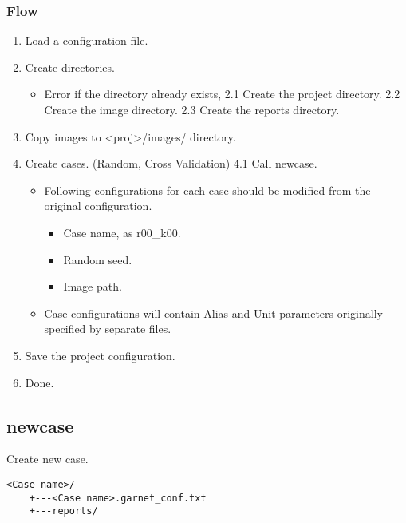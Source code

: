 \documentclass[]{article}
\begin{document}
\subsubsection{Flow}\label{flow}

\begin{enumerate}
\def\labelenumi{\arabic{enumi}.}
\itemsep1pt\parskip0pt
\item
  Load a configuration file.
\item
  Create directories.

  \begin{itemize}
  \itemsep1pt\parskip0pt
  \item
    Error if the directory already exists, 2.1 Create the project
    directory. 2.2 Create the image directory. 2.3 Create the reports
    directory.
  \end{itemize}
\item
  Copy images to \textless{}proj\textgreater{}/images/ directory.
\item
  Create cases. (Random, Cross Validation) 4.1 Call newcase.

  \begin{itemize}
  \itemsep1pt\parskip0pt
  \item
    Following configurations for each case should be modified from the
    original configuration.

    \begin{itemize}
    \itemsep1pt\parskip0pt
    \item
      Case name, as r00\_k00.
    \item
      Random seed.
    \item
      Image path.
    \end{itemize}
  \item
    Case configurations will contain Alias and Unit parameters
    originally specified by separate files.
  \end{itemize}
\item
  Save the project configuration.
\item
  Done.
\end{enumerate}

\subsection{newcase}\label{newcase}

Create new case.

\begin{verbatim}
<Case name>/
    +---<Case name>.garnet_conf.txt
    +---reports/
\end{verbatim}
\end{document}
